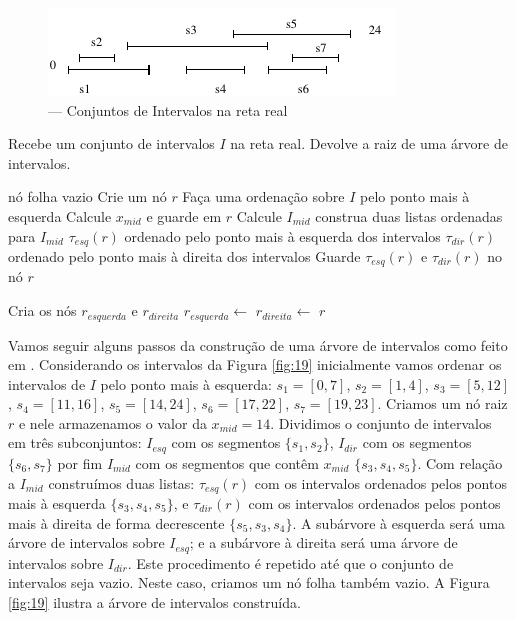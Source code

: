 \begin{figure}[h!]
    \begin{center}
        \includegraphics[scale=1.5]{images/interval_tree5.pdf}
    \end{center}
    \caption {— Conjuntos de Intervalos na reta real}
    \label{fig:18}
\end{figure}

\begin{algorithm}[h!]
    \caption{Recebe um conjunto de intervalos $I$ na reta real. Devolve a raiz de uma árvore de intervalos.}
    \begin{algorithmic}[1]
                \Return nó folha vazio
            \Else
                \State Crie um nó $r$
                \State Faça uma ordenação sobre $I$ pelo ponto mais à esquerda
                \State Calcule $x_{mid}$ e guarde em $r$ 
                \State Calcule $I_{mid}$ construa duas listas ordenadas para $I_{mid}$
                \State $\tau_{esq}(r)$ ordenado pelo ponto mais à esquerda dos intervalos
                \State $\tau_{dir}(r)$ ordenado pelo ponto mais à direita dos intervalos
                \State Guarde $\tau_{esq}(r)$ e $\tau_{dir}(r)$ no nó $r$
                
                \State Cria os nós $r_{esquerda}$ e $r_{direita}$
                \State $r_{esquerda} \leftarrow $ 
                \State $r_{direita} \leftarrow $ 
                \State \Return $r$
            \EndIf
        \EndFunction
    \end{algorithmic}
\end{algorithm}


Vamos seguir alguns passos da construção de uma árvore de intervalos como feito em \cite{cgi1}. Considerando os intervalos da Figura \ref{fig:19} inicialmente vamos ordenar os intervalos de $I$ pelo ponto mais à esquerda: $s_1 = [0, 7]$, $s_2 = [1, 4]$, $s_3 = [5, 12]$, $s_4 = [11,16]$, $s_5 = [14, 24]$, $s_6 = [17, 22]$, $s_7 = [19, 23]$. Criamos um nó raiz $r$ e nele armazenamos o valor da $x_{mid}  = 14$. Dividimos o conjunto de intervalos em três subconjuntos: $I_{esq}$ com os segmentos $\{s_1, s_2\}$, $I_{dir}$ com os segmentos $\{s_6, s_7\}$ por fim $I_{mid}$ com os segmentos que contêm $x_{mid}$ $\{ s_3, s_4, s_5\}$. Com relação a $I_{mid}$ construímos duas listas: $\tau_{esq}(r)$ com os intervalos ordenados pelos pontos mais à esquerda $\{s_3,s_4,s_5\}$, e $\tau_{dir}(r)$ com os intervalos ordenados pelos pontos mais à direita de forma decrescente $\{s_5, s_3, s_4\}$. A subárvore à esquerda será uma árvore de intervalos sobre $I_{esq}$; e a subárvore à direita será uma árvore de intervalos sobre $I_{dir}$. Este procedimento é repetido até que o conjunto de intervalos seja vazio. Neste caso, criamos um nó folha também vazio.
A Figura \ref{fig:19} ilustra a árvore de intervalos construída.


